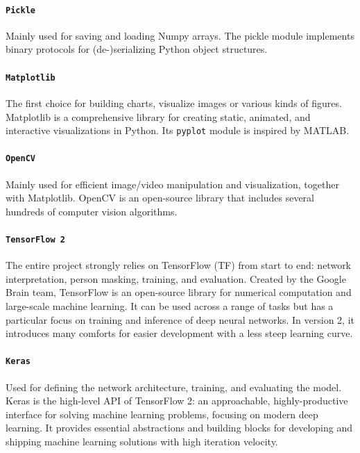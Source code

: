 \paragraph*{\texttt{Pickle}}
Mainly used for saving and loading Numpy arrays. The pickle module implements binary protocols for (de-)serializing Python object structures. 

\paragraph*{\texttt{Matplotlib}}
The first choice for building charts, visualize images or various kinds of figures. Matplotlib is a comprehensive library for creating static, animated, and interactive visualizations in Python. Its \texttt{pyplot} module is inspired by MATLAB.

\paragraph*{\texttt{OpenCV}}
Mainly used for efficient image/video manipulation and visualization, together with Matplotlib. OpenCV is an open-source library that includes several hundreds of computer vision algorithms.

\paragraph*{\texttt{TensorFlow 2}}
The entire project strongly relies on TensorFlow \cite{tensorflow} (TF) from start to end: network interpretation, person masking, training, and evaluation. Created by the Google Brain team, TensorFlow is an open-source library for numerical computation and large-scale machine learning. It can be used across a range of tasks but has a particular focus on training and inference of deep neural networks. In version 2, it introduces many comforts for easier development with a less steep learning curve.

\paragraph*{\texttt{Keras}}
Used for defining the network architecture, training, and evaluating the model. Keras  \cite{keras} is the high-level API of TensorFlow 2: an approachable, highly-productive interface for solving machine learning problems, focusing on modern deep learning. It provides essential abstractions and building blocks for developing and shipping machine learning solutions with high iteration velocity.

